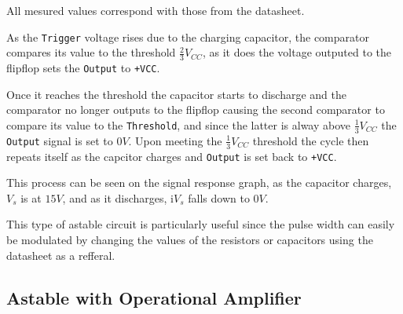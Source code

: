 \documentclass[11pt, openright]{book}
\begin{document}
All mesured values correspond with those from the datasheet.

As the \verb|Trigger| voltage rises due to the charging capacitor, the comparator compares its value to the threshold $\frac{2}{3}V_{CC}$, as it does the voltage outputed to the flipflop sets the \verb|Output| to \verb|+VCC|. 

Once it reaches the threshold the capacitor starts to discharge and the comparator no longer outputs to the flipflop causing the second comparator to compare its value to the \verb|Threshold|, and since the latter is alway above $\frac{1}{3}V_{CC}$ the \verb|Output| signal is set to $0V$. Upon meeting the $\frac{1}{3}V_{CC}$ threshold the cycle then repeats itself as the capcitor charges and \verb|Output| is set back to \verb|+VCC|.

This process can be seen on the signal response graph, as the capacitor charges, $V_s$ is at $15V$, and as it discharges, i$V_s$ falls down to $0V$.

This type of astable circuit is particularly useful since the pulse width can easily be modulated by changing the values of the resistors or capacitors using the datasheet as a refferal.

\subsection{Astable with Operational Amplifier}
\end{document}
